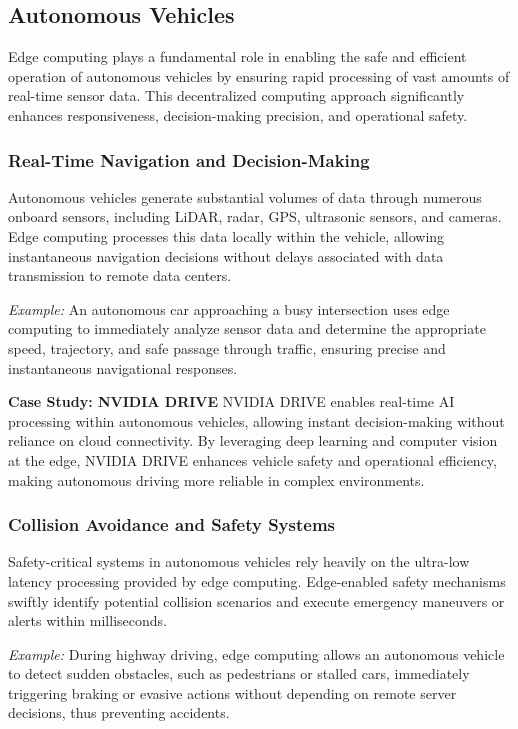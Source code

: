 \documentclass[runningheads]{llncs}
\begin{document}
\subsection{Autonomous Vehicles}

Edge computing plays a fundamental role in enabling the safe and efficient operation of autonomous vehicles by ensuring rapid processing of vast amounts of real-time sensor data. This decentralized computing approach significantly enhances responsiveness, decision-making precision, and operational safety.

\subsubsection{Real-Time Navigation and Decision-Making}
Autonomous vehicles generate substantial volumes of data through numerous onboard sensors, including LiDAR, radar, GPS, ultrasonic sensors, and cameras. Edge computing processes this data locally within the vehicle, allowing instantaneous navigation decisions without delays associated with data transmission to remote data centers.

\noindent\textit{Example:} An autonomous car approaching a busy intersection uses edge computing to immediately analyze sensor data and determine the appropriate speed, trajectory, and safe passage through traffic, ensuring precise and instantaneous navigational responses.

\noindent\textbf{Case Study: NVIDIA DRIVE}
NVIDIA DRIVE enables real-time AI processing within autonomous vehicles, allowing instant decision-making without reliance on cloud connectivity. By leveraging deep learning and computer vision at the edge, NVIDIA DRIVE enhances vehicle safety and operational efficiency, making autonomous driving more reliable in complex environments.

\subsubsection{Collision Avoidance and Safety Systems}
Safety-critical systems in autonomous vehicles rely heavily on the ultra-low latency processing provided by edge computing. Edge-enabled safety mechanisms swiftly identify potential collision scenarios and execute emergency maneuvers or alerts within milliseconds.

\noindent\textit{Example:} During highway driving, edge computing allows an autonomous vehicle to detect sudden obstacles, such as pedestrians or stalled cars, immediately triggering braking or evasive actions without depending on remote server decisions, thus preventing accidents.
\end{document}
